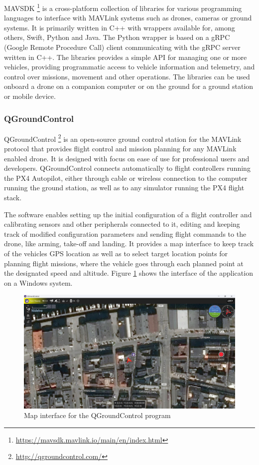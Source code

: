 MAVSDK \footnote{\url{https://mavsdk.mavlink.io/main/en/index.html}} is a cross-platform collection of libraries for various programming languages
to interface with MAVLink systems such as drones, cameras or ground systems.
It is primarily written in C++ with wrappers available for,
among others, Swift, Python and Java.
The Python wrapper is based on a gRPC (Google Remote Procedure Call) client communicating with the gRPC server written in C++.
The libraries provides a simple API for managing one or more vehicles, 
providing programmatic access to vehicle information and telemetry, 
and control over missions, movement and other operations.
The libraries can be used onboard a drone on a companion computer
or on the ground for a ground station or mobile device.


\subsubsection{QGroundControl}
\label{subsec:qgc}
QGroundControl \footnote{\url{http://qgroundcontrol.com/}} is an open-source ground control station for the MAVLink protocol that provides flight control and mission planning for any MAVLink enabled drone.
It is designed with focus on ease of use for professional users and developers.
QGroundControl connects automatically to flight controllers running the PX4 Autopilot, either through cable or wireless connection to the computer running the ground station, as well as to any simulator running the PX4 flight stack.

The software enables setting up the initial configuration of a flight controller and calibrating sensors and other peripherals connected to it, editing and keeping track of modified configuration parameters and sending flight commands to the drone, like arming, take-off and landing.
It provides a map interface to keep track of the vehicles GPS location as well as to select target location points for planning flight missions, where the vehicle goes through each planned point at the designated speed and altitude.
Figure \ref{fig:qgc-map} shows the interface of the application on a Windows system.

\begin{figure}
  \centering
  \includegraphics[width=\textwidth,keepaspectratio]{img/qgc-map.png}
  \caption{Map interface for the QGroundControl program}\label{fig:qgc-map}
\end{figure}

